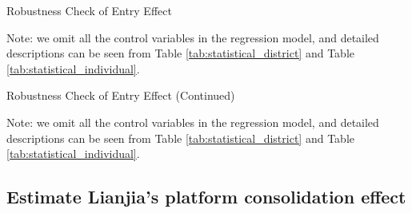 \documentclass[11pt]{article}
\begin{document}

\begin{table}
  \begin{center}
    \begin{scriptsize}
      \caption{Robustness Check of Entry Effect}
      \label{tab:entry_effect_robustness_1}
      
    
    Note: we omit all the control variables in the regression model, and detailed descriptions can be seen from Table \ref{tab:statistical_district} and Table \ref{tab:statistical_individual}.
    \end{scriptsize}
  \end{center}
\end{table}

\begin{table}
  \begin{center}
    \begin{scriptsize}
      \caption{Robustness Check of Entry Effect (Continued)}
      \label{tab:entry_effect_robustness_2}
      
    
    Note: we omit all the control variables in the regression model, and detailed descriptions can be seen from Table \ref{tab:statistical_district} and Table \ref{tab:statistical_individual}.
    \end{scriptsize}
  \end{center}
\end{table}

\subsection{Estimate Lianjia's platform consolidation effect} \label{subsec:acn_strategy}
\end{document}
